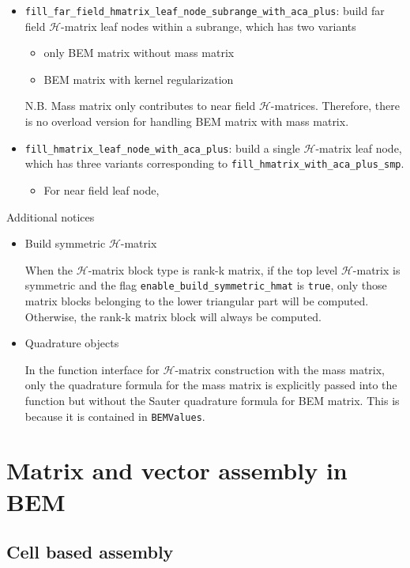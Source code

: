 \documentclass[11pt, a4paper]{article}
\begin{document}
\begin{itemize}
\item \texttt{fill\_far\_field\_hmatrix\_leaf\_node\_subrange\_with\_aca\_plus}: build
  far field $\mathcal{H}$-matrix leaf nodes within a subrange, which has two variants
  \begin{itemize}
  \item only BEM matrix without mass matrix
  \item BEM matrix with kernel regularization
  \end{itemize}
  N.B. Mass matrix only contributes to near field $\mathcal{H}$-matrices. Therefore, there
  is no overload version for handling BEM matrix with mass matrix.
\item \texttt{fill\_hmatrix\_leaf\_node\_with\_aca\_plus}: build a single
  $\mathcal{H}$-matrix leaf node, which has three variants corresponding
  to \texttt{fill\_hmatrix\_with\_aca\_plus\_smp}.
  \begin{itemize}
  \item For near field leaf node, 
  \end{itemize}
\end{itemize}

Additional notices
\begin{itemize}
\item Build symmetric $\mathcal{H}$-matrix

  When the $\mathcal{H}$-matrix block type is rank-k matrix, if the top level
  $\mathcal{H}$-matrix is symmetric and the flag \texttt{enable\_build\_symmetric\_hmat}
  is \texttt{true}, only those matrix blocks belonging to the lower triangular part will
  be computed. Otherwise, the rank-k matrix block will always be computed.
\item Quadrature objects

  In the function interface for \(\mathcal{H}\)-matrix construction with the mass matrix,
  only the quadrature formula for the mass matrix is explicitly passed into the function
  but without the Sauter quadrature formula for BEM matrix. This is because it is
  contained in \texttt{BEMValues}.
\end{itemize}

\section{Matrix and vector assembly in BEM}

\subsection{Cell based assembly}
\end{document}
